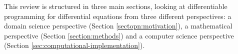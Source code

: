 This review is structured in three main sections, looking at differentiable programming for differential equations from three different perspectives: a domain science perspective (Section \ref{sectopn:motivation}), a mathematical perspective (Section \ref{section:methods}) and a computer science perspective (Section \ref{sec:computational-implementation}). 

